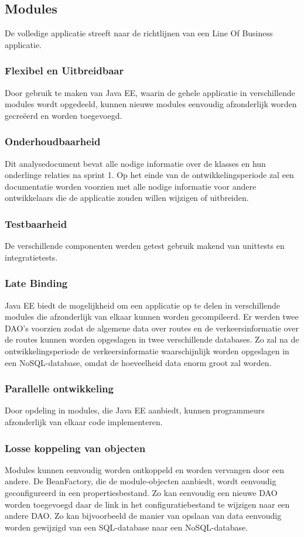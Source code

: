 \documentclass[ps,a4paper,oneside]{report}
\begin{document}
\subsection{Modules}
De volledige applicatie streeft naar de richtlijnen van een Line Of Business applicatie. 
\subsubsection{Flexibel en Uitbreidbaar}
Door gebruik te maken van Java EE, waarin de gehele applicatie in verschillende modules wordt opgedeeld, kunnen nieuwe modules eenvoudig afzonderlijk worden gecreëerd en worden toegevoegd. 
\subsubsection{Onderhoudbaarheid}
Dit analysedocument bevat alle nodige informatie over de klasses en hun onderlinge relaties na sprint 1. Op het einde van de ontwikkelingsperiode zal een documentatie worden voorzien met alle nodige informatie voor andere ontwikkelaars die de applicatie zouden willen wijzigen of uitbreiden.
\subsubsection{Testbaarheid}
De verschillende componenten werden getest gebruik makend van unittests en integratietests.
\subsubsection{Late Binding}
Java EE biedt de mogelijkheid om een applicatie op te delen in verschillende modules die afzonderlijk van elkaar kunnen worden gecompileerd. Er werden twee DAO’s voorzien zodat de algemene data over routes en de verkeersinformatie over de routes kunnen worden opgeslagen in twee verschillende databases. Zo zal na de ontwikkelingsperiode de verkeersinformatie waarschijnlijk worden opgeslagen in een NoSQL-database, omdat de hoeveelheid data enorm groot zal worden. 
\subsubsection{Parallelle ontwikkeling}
Door opdeling in modules, die Java EE aanbiedt, kunnen programmeurs afzonderlijk van elkaar code implementeren.
\subsubsection{Losse koppeling van objecten}
Modules kunnen eenvoudig worden ontkoppeld en worden vervangen door een andere. De BeanFactory, die de module-objecten aanbiedt, wordt eenvoudig geconfigureerd in een propertiesbestand. Zo kan eenvoudig een nieuwe DAO worden toegevoegd daar de link in het configuratiebestand te wijzigen naar een andere DAO. Zo kan bijvoorbeeld de manier van opslaan van data eenvoudig worden gewijzigd van een SQL-database naar een NoSQL-database.
\end{document}
